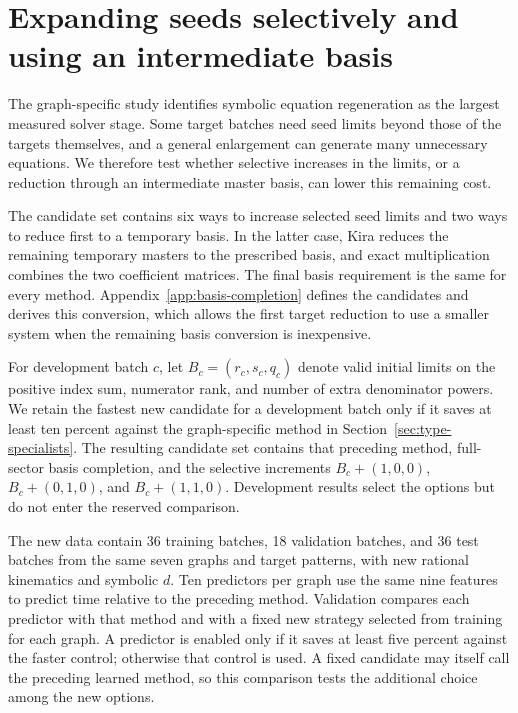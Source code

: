 \providecommand{\StudySection}{\section}
\providecommand{\StudySubsection}{\subsection}

\StudySection{Expanding seeds selectively and using an intermediate basis}
\label{sec:basis-completion}
The graph-specific study identifies symbolic equation regeneration as the largest measured solver stage. Some target batches need seed limits beyond those of the targets themselves, and a general enlargement can generate many unnecessary equations. We therefore test whether selective increases in the limits, or a reduction through an intermediate master basis, can lower this remaining cost.

The candidate set contains six ways to increase selected seed limits and two ways to reduce first to a temporary basis. In the latter case, Kira reduces the remaining temporary masters to the prescribed basis, and exact multiplication combines the two coefficient matrices. The final basis requirement is the same for every method. Appendix~\ref{app:basis-completion} defines the candidates and derives this conversion, which allows the first target reduction to use a smaller system when the remaining basis conversion is inexpensive.

For development batch $c$, let $B_c=(r_c,s_c,q_c)$ denote valid initial limits on the positive index sum, numerator rank, and number of extra denominator powers. We retain the fastest new candidate for a development batch only if it saves at least ten percent against the graph-specific method in Section~\ref{sec:type-specialists}. The resulting candidate set contains that preceding method, full-sector basis completion, and the selective increments $B_c+(1,0,0)$, $B_c+(0,1,0)$, and $B_c+(1,1,0)$. Development results select the options but do not enter the reserved comparison.

The new data contain 36 training batches, 18 validation batches, and 36 test batches from the same seven graphs and target patterns, with new rational kinematics and symbolic $d$. Ten predictors per graph use the same nine features to predict time relative to the preceding method. Validation compares each predictor with that method and with a fixed new strategy selected from training for each graph. A predictor is enabled only if it saves at least five percent against the faster control; otherwise that control is used. A fixed candidate may itself call the preceding learned method, so this comparison tests the additional choice among the new options.

